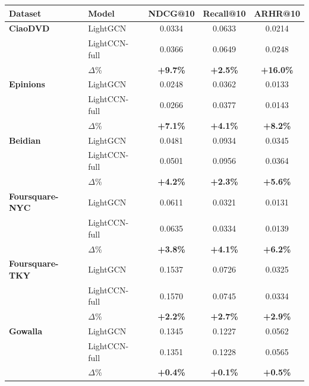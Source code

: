 \begin{tabular}{llccc}
\toprule
Dataset & Model & NDCG@10 & Recall@10 & ARHR@10 \\
\midrule
\textbf{CiaoDVD} & LightGCN & 0.0334 & 0.0633 & 0.0214 \\
 & LightCCN-full & 0.0366 & 0.0649 & 0.0248 \\
 & $\Delta$\% & \textbf{+9.7\%} & \textbf{+2.5\%} & \textbf{+16.0\%} \\
\addlinespace
\textbf{Epinions} & LightGCN & 0.0248 & 0.0362 & 0.0133 \\
 & LightCCN-full & 0.0266 & 0.0377 & 0.0143 \\
 & $\Delta$\% & \textbf{+7.1\%} & \textbf{+4.1\%} & \textbf{+8.2\%} \\
\addlinespace
\textbf{Beidian} & LightGCN & 0.0481 & 0.0934 & 0.0345 \\
 & LightCCN-full & 0.0501 & 0.0956 & 0.0364 \\
 & $\Delta$\% & \textbf{+4.2\%} & \textbf{+2.3\%} & \textbf{+5.6\%} \\
\addlinespace
\textbf{Foursquare-NYC} & LightGCN & 0.0611 & 0.0321 & 0.0131 \\
 & LightCCN-full & 0.0635 & 0.0334 & 0.0139 \\
 & $\Delta$\% & \textbf{+3.8\%} & \textbf{+4.1\%} & \textbf{+6.2\%} \\
\addlinespace
\textbf{Foursquare-TKY} & LightGCN & 0.1537 & 0.0726 & 0.0325 \\
 & LightCCN-full & 0.1570 & 0.0745 & 0.0334 \\
 & $\Delta$\% & \textbf{+2.2\%} & \textbf{+2.7\%} & \textbf{+2.9\%} \\
\addlinespace
\textbf{Gowalla} & LightGCN & 0.1345 & 0.1227 & 0.0562 \\
 & LightCCN-full & 0.1351 & 0.1228 & 0.0565 \\
 & $\Delta$\% & \textbf{+0.4\%} & \textbf{+0.1\%} & \textbf{+0.5\%} \\
\bottomrule
\end{tabular}
